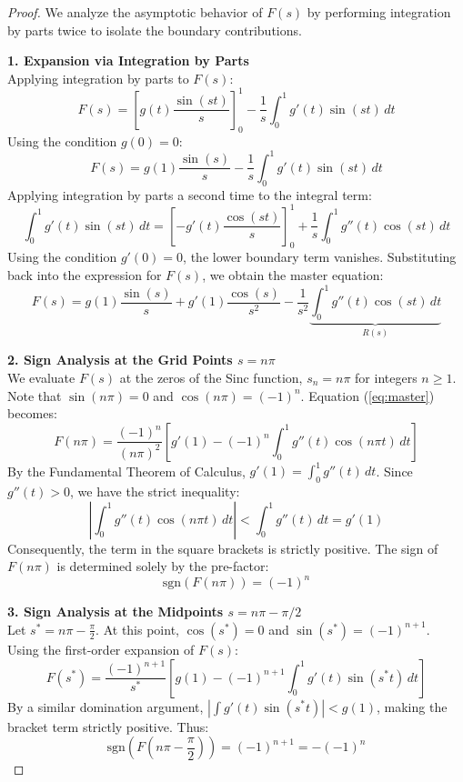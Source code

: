 \documentclass[11pt]{article}
\theoremstyle{breakdef}
\begin{document}
\begin{proof}
We analyze the asymptotic behavior of $F(s)$ by performing integration by parts twice to isolate the boundary contributions.

\noindent \textbf{1. Expansion via Integration by Parts} \\
Applying integration by parts to $F(s)$:
\begin{equation}
F(s) = \left[ g(t) \frac{\sin(st)}{s} \right]_0^1 - \frac{1}{s} \int_0^1 g'(t) \sin(st) \, dt 
\end{equation}
Using the condition $g(0)=0$:
$$ F(s) = g(1)\frac{\sin(s)}{s} - \frac{1}{s} \int_0^1 g'(t) \sin(st) \, dt $$
Applying integration by parts a second time to the integral term:
$$ \int_0^1 g'(t) \sin(st) \, dt = \left[ -g'(t) \frac{\cos(st)}{s} \right]_0^1 + \frac{1}{s} \int_0^1 g''(t) \cos(st) \, dt $$
Using the condition $g'(0)=0$, the lower boundary term vanishes. Substituting back into the expression for $F(s)$, we obtain the master equation:
\begin{equation}
F(s) = g(1)\frac{\sin(s)}{s} + g'(1)\frac{\cos(s)}{s^2} - \frac{1}{s^2} \underbrace{\int_0^1 g''(t) \cos(st) \, dt}_{R(s)}
\label{eq:master}
\end{equation}

\noindent \textbf{2. Sign Analysis at the Grid Points $s = n\pi$} \\
We evaluate $F(s)$ at the zeros of the Sinc function, $s_n = n\pi$ for integers $n \ge 1$.
Note that $\sin(n\pi) = 0$ and $\cos(n\pi) = (-1)^n$. Equation (\ref{eq:master}) becomes:
$$ F(n\pi) = \frac{(-1)^n}{(n\pi)^2} \left[ g'(1) - (-1)^n \int_0^1 g''(t) \cos(n\pi t) \, dt \right] $$
By the Fundamental Theorem of Calculus, $g'(1) = \int_0^1 g''(t) \, dt$. Since $g''(t) > 0$, we have the strict inequality:
$$ \left| \int_0^1 g''(t) \cos(n\pi t) \, dt \right| < \int_0^1 g''(t) \, dt = g'(1) $$
Consequently, the term in the square brackets is strictly positive. The sign of $F(n\pi)$ is determined solely by the pre-factor:
\begin{equation}
\text{sgn}(F(n\pi)) = (-1)^n
\end{equation}

\noindent \textbf{3. Sign Analysis at the Midpoints $s = n\pi - \pi/2$} \\
Let $s^* = n\pi - \frac{\pi}{2}$. At this point, $\cos(s^*) = 0$ and $\sin(s^*) = (-1)^{n+1}$.
Using the first-order expansion of $F(s)$:
$$ F(s^*) = \frac{(-1)^{n+1}}{s^*} \left[ g(1) - (-1)^{n+1} \int_0^1 g'(t) \sin(s^* t) \, dt \right] $$
By a similar domination argument, $\left| \int g'(t) \sin(s^* t) \right| < g(1)$, making the bracket term strictly positive. Thus:
\begin{equation}
\text{sgn}\left(F\left(n\pi - \frac{\pi}{2}\right)\right) = (-1)^{n+1} = -(-1)^n
\end{equation}


\end{proof}
\end{document}
